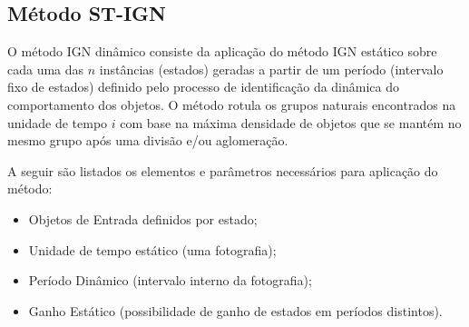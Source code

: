 \begin{figure}[!ht]
	\centering
\end{figure}

\subsection{Método ST-IGN}
\label{stign}
O método IGN dinâmico consiste da aplicação do método IGN estático \cite{simposioNeg2003} sobre cada uma das $n$ instâncias (estados) geradas a partir de um período (intervalo fixo de estados) definido pelo processo de identificação da dinâmica do comportamento dos objetos. O método rotula os grupos naturais encontrados na unidade de tempo $i$ com base na máxima densidade de objetos que se mantém no mesmo grupo após uma divisão e/ou aglomeração.

A seguir são listados os elementos e parâmetros necessários para aplicação do método:
\begin{itemize}
\item Objetos de Entrada definidos por estado;
\item Unidade de tempo estático (uma fotografia);
\item Período Dinâmico (intervalo interno da fotografia);
\item Ganho Estático (possibilidade de ganho de estados em períodos distintos).
\end{itemize}

